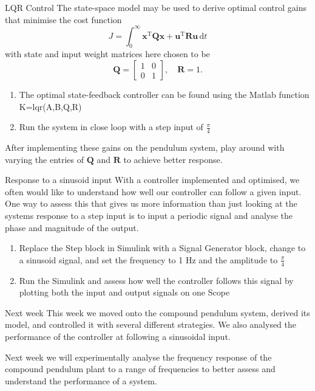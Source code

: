 \documentclass[9pt]{beamer-control}
\begin{document}
\begin{frame}{LQR Control}
The state-space model may be used to derive optimal control gains that minimise the cost function
\[J = \int^\infty _0 \mathbf{x}^\mathrm{T} \mathbf{Q} \mathbf{x} + \mathbf{u}^\mathrm{T} \mathbf{R} \mathbf{u}  \, \mathrm{d} t\]
with state and input weight matrices here chosen to be 
\[ \mathbf{Q} = \begin{bmatrix}
	1 & 0 \\ 0 & 1
\end{bmatrix}, \quad \mathbf{R} = 1 .\]

\begin{enumerate}
	\item The optimal state-feedback controller can be found using the Matlab function K=lqr(A,B,Q,R)
	\item Run the system in close loop with a step input of $\tfrac{\pi}{4}$
\end{enumerate}

After implementing these gains on the pendulum system, play around with varying the entries of $\mathbf{Q}$ and $\mathbf{R}$ to achieve better response.
\end{frame}



\begin{frame}{Response to a sinusoid input}
With a controller implemented and optimised, we often would like to understand how well our controller can follow a given input. One way to assess this that gives us more information than just looking at the systems response to a step input is to input a periodic signal and analyse the phase and magnitude of the output.

\begin{enumerate}
	\item Replace the Step block in Simulink with a Signal Generator block, change to a sinusoid signal, and set the frequency to 1 Hz and the amplitude to $\tfrac{\pi}{4}$
	\item Run the Simulink and assess how well the controller follows this signal by plotting both the input and output signals on one Scope
\end{enumerate}

\end{frame}



\begin{frame}{Next week}
	This week we moved onto the compound pendulum system, derived its model, and controlled it with several different strategies. We also analysed the performance of the controller at following a sinusoidal input.
	
	Next week we will experimentally analyse the frequency response of the compound pendulum plant to a range of frequencies to better assess and understand the performance of a system.
\end{frame}
\end{document}
